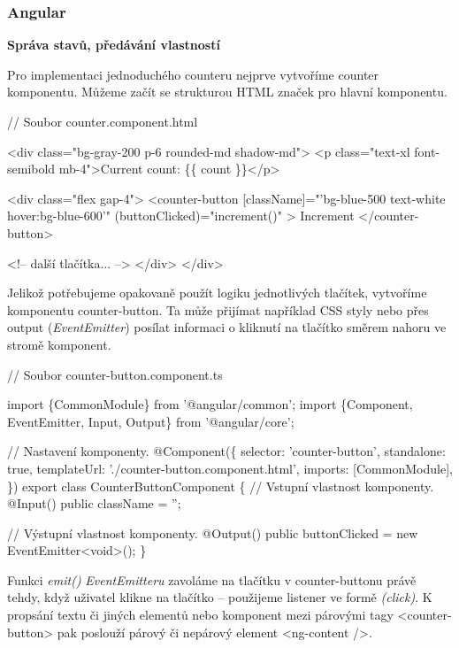 \subsubsection{Angular}

\begin{flushleft}
  \textbf{Správa stavů, předávání vlastností}
\end{flushleft}

Pro implementaci jednoduchého counteru nejprve vytvoříme counter komponentu. Můžeme začít se strukturou HTML značek pro hlavní komponentu.

\begin{prog}
// Soubor counter.component.html

<div class="bg-gray-200 p-6 rounded-md shadow-md">
  <p class="text-xl font-semibold mb-4">Current count: \{\{ count \}\}</p>

  <div class="flex gap-4">
    <counter-button
      [className]="'bg-blue-500 text-white hover:bg-blue-600'"
      (buttonClicked)="increment()"
    >
      Increment
    </counter-button>

    <!-- další tlačítka... -->
  </div>
</div>
\end{prog}

Jelikož potřebujeme opakovaně použít logiku jednotlivých tlačítek, vytvoříme komponentu counter-button. 
Ta může přijímat například CSS styly nebo přes output (\emph{EventEmitter}) posílat informaci o kliknutí na tlačítko směrem nahoru ve stromě komponent.

\begin{prog}
// Soubor counter-button.component.ts

import \{CommonModule\} from '@angular/common';
import \{Component, EventEmitter, Input, Output\} from '@angular/core';

// Nastavení komponenty.
@Component(\{
  selector: 'counter-button',
  standalone: true,
  templateUrl: './counter-button.component.html',
  imports: [CommonModule],
\})
export class CounterButtonComponent \{
  // Vstupní vlastnost komponenty.
  @Input() public className = '';

  // Výstupní vlastnost komponenty.
  @Output() public buttonClicked = new EventEmitter<void>();
\}
\end{prog}

Funkci \emph{emit()} \emph{EventEmitteru} zavoláme na tlačítku v counter-buttonu právě tehdy, když uživatel klikne na tlačítko -- použijeme listener ve formě \emph{(click)}. 
K propsání textu či jiných elementů nebo komponent mezi párovými tagy <counter-button> pak poslouží párový či nepárový element <ng-content />.

